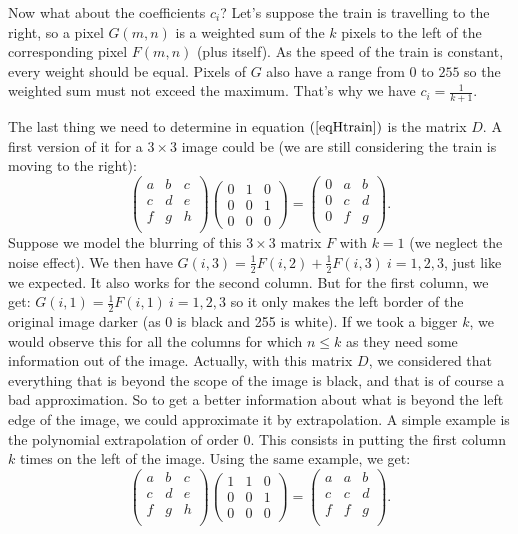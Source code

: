Now what about the coefficients $c_i$? Let's suppose the train is travelling to the right, so a pixel $G(m,n)$ is a weighted sum of the $k$ pixels to the left of the corresponding pixel $F(m,n)$ (plus itself). As the speed of the train is constant, every weight should be equal. Pixels of $G$ also have a range from $0$ to $255$ so the weighted sum must not exceed the maximum. That's why we have $c_i=\frac{1}{k+1}$.

The last thing we need to determine in  equation $(\ref{eqHtrain})$ is the matrix $D$. A first version of it for a $3 \times 3$ image could be (we are still considering the train is moving to the right):
$$
\begin{pmatrix}
a & b & c \\
c & d & e \\
f & g & h \\
\end{pmatrix}
\begin{pmatrix}
0 & 1 & 0 \\
0 & 0 & 1 \\
0 & 0 & 0
\end{pmatrix}
=
\begin{pmatrix}
0 & a & b \\
0 & c & d \\
0 & f & g \\
\end{pmatrix}.
$$
Suppose we model the blurring of this $3 \times 3$ matrix $F$ with $k=1$ (we neglect the noise effect). We then have $G(i,3) = \frac{1}{2} F(i,2) + \frac{1}{2} F(i,3)~i=1,2,3$, just like we expected. It also works for the second column. But for the first column, we get: $G(i,1) = \frac{1}{2} F(i,1)~i=1,2,3$ so it only makes the left border of the original image darker (as 0 is black and 255 is white). If we took a bigger $k$, we would observe this for all the columns for which $n \leq k$ as they need some information out of the image. Actually, with this matrix $D$, we considered that everything that is beyond the scope of the image is black, and that is of course a bad approximation. So to get a better information about what is beyond the left edge of the image, we could approximate it by extrapolation. A simple example is the polynomial extrapolation of order 0. This consists in putting the first column $k$ times on the left of the image. Using the same example, we get:
$$
\begin{pmatrix}
a & b & c \\
c & d & e \\
f & g & h \\
\end{pmatrix}
\begin{pmatrix}
1 & 1 & 0 \\
0 & 0 & 1 \\
0 & 0 & 0
\end{pmatrix}
=
\begin{pmatrix}
a & a & b \\
c & c & d \\
f & f & g \\
\end{pmatrix}.
$$
